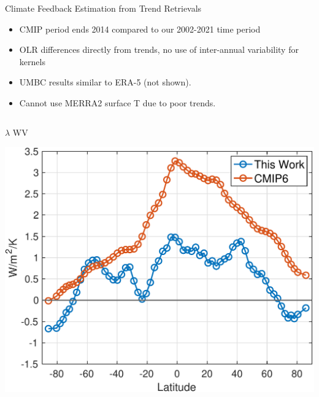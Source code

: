 \documentclass[10pt,t]{beamer}
\begin{document}
\begin{frame}{Climate Feedback Estimation from Trend Retrievals}
\vspace{-0.15in}
\small
\begin{itemize}
\item CMIP period ends 2014 compared to our 2002-2021 time period
\item OLR differences directly from trends, no use of inter-annual variability for kernels
\item UMBC results similar to ERA-5 (not shown).
\item Cannot use MERRA2 surface T due to poor trends.
\end{itemize}

\vspace{-0.25in}
\begin{columns}
\begin{column}{0.5\columnwidth}
\begin{block}{\(\lambda\) WV}
\vspace{-0.1in}
\begin{center}
\includegraphics[width=\linewidth]{SunClimate2022/wvlamda2.pdf}
\end{center}
\end{block}
\end{column}



\end{columns}
\end{frame}
\end{document}
